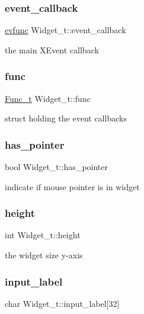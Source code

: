 \subsubsection{\texorpdfstring{event\+\_\+callback}{event\_callback}}
{\footnotesize\ttfamily \hyperlink{xwidget_8h_ab4ae973f86a383c8c0f92b709044520a}{evfunc} Widget\+\_\+t\+::event\+\_\+callback}

the main X\+Event callback \mbox{\label{structWidget__t_a225b9a175e132994a5aa73b59a2911ad}} 
\subsubsection{\texorpdfstring{func}{func}}
{\footnotesize\ttfamily \hyperlink{structFunc__t}{Func\+\_\+t} Widget\+\_\+t\+::func}

struct holding the event callbacks \mbox{\label{structWidget__t_ac8c396c698d816afad49fa751c3ca2c8}} 
\subsubsection{\texorpdfstring{has\+\_\+pointer}{has\_pointer}}
{\footnotesize\ttfamily bool Widget\+\_\+t\+::has\+\_\+pointer}

indicate if mouse pointer is in widget \mbox{\label{structWidget__t_a1def6d2237743e75a0b84ca0c34a6834}} 
\subsubsection{\texorpdfstring{height}{height}}
{\footnotesize\ttfamily int Widget\+\_\+t\+::height}

the widget size y-\/axis \mbox{\label{structWidget__t_ac5cb454301472edeb16e563ef2149dbb}} 
\subsubsection{\texorpdfstring{input\+\_\+label}{input\_label}}
{\footnotesize\ttfamily char Widget\+\_\+t\+::input\+\_\+label\mbox{[}32\mbox{]}}

